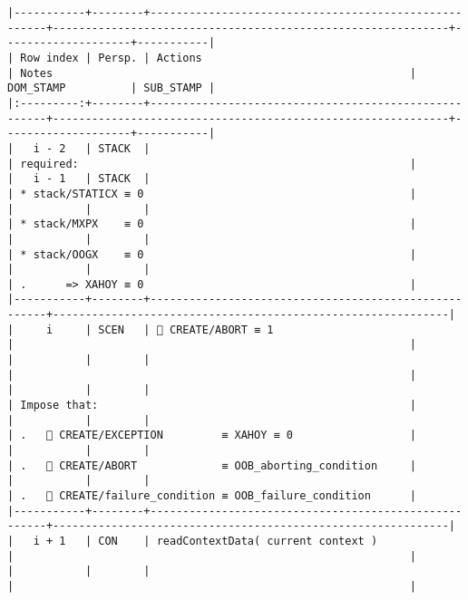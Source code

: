\documentclass[varwidth=\maxdimen,margin=0.5cm,multi={verbatim}]{standalone}
\begin{document}
\begin{verbatim}
|-----------+--------+------------------------------------------------------+-------------------------------------------------------------+--------------------+-----------|
| Row index | Persp. | Actions                                              | Notes                                                       | DOM_STAMP          | SUB_STAMP |
|:---------:+--------+------------------------------------------------------+-------------------------------------------------------------+--------------------+-----------|
|   i - 2   | STACK  |                                                      | required:                                                   |
|   i - 1   | STACK  |                                                      | * stack/STATICX ≡ 0                                         |
|           |        |                                                      | * stack/MXPX    ≡ 0                                         |
|           |        |                                                      | * stack/OOGX    ≡ 0                                         |
|           |        |                                                      | .      => XAHOY ≡ 0                                         |
|-----------+--------+------------------------------------------------------+-------------------------------------------------------------|
|     i     | SCEN   |  CREATE/ABORT ≡ 1                                   |                                                             |
|           |        |                                                      |                                                             |
|           |        |                                                      | Impose that:                                                |
|           |        |                                                      | .    CREATE/EXCEPTION         ≡ XAHOY ≡ 0                  |
|           |        |                                                      | .    CREATE/ABORT             ≡ OOB_aborting_condition     |
|           |        |                                                      | .    CREATE/failure_condition ≡ OOB_failure_condition      |
|-----------+--------+------------------------------------------------------+-------------------------------------------------------------|
|   i + 1   | CON    | readContextData( current context )                   |                                                             |
|           |        |                                                      |                                                             |

\end{verbatim}
\end{document}
